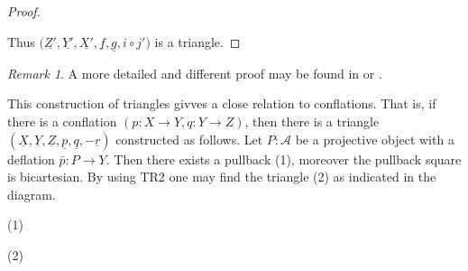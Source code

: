 \documentclass[12pt]{article}
\theoremstyle{definition}
\theoremstyle{remark}
\newtheorem*{remark}{Remark}
\newcommand{\upside}[1]{\rotatebox[origin=c]{180}{#1}}
\begin{document}
\begin{proof}
\begin{center}
\begin{tikzcd}
                    \end{tikzcd}
                \end{center}
                Thus $(\underline{Z'},\underline{Y'},\underline{X'},\underline{f},\underline{g},$\underline{\upside{$\Omega$}$i\circ j'$}$)$ is a triangle. 
            \end{proof}

            \begin{remark}
                A more detailed and different proof may be found in \cite{Hol12} or \cite{Mat20}.
            \end{remark}

            This construction of triangles givves a close relation to conflations. That is, if there is a conflation $(p:X\rightarrow Y,q:Y\rightarrow Z)$, then there is a triangle $(\underline{X},\underline{Y},\underline{Z},\underline{p},\underline{q},-\underline{r})$ constructed as follows. Let $P:\mathcal{A}$ be a projective object with a deflation $\bar{p}:P\rightarrow Y$. Then there exists a pullback (1), moreover the pullback square is bicartesian. By using TR2 one may find the triangle (2) as indicated in the diagram.
            \begin{center}
                (1)
                (2)
            \end{center}
\end{document}
